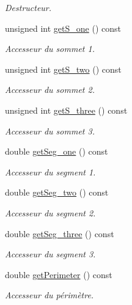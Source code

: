 \begin{DoxyCompactItemize}
\begin{DoxyCompactList}\small\item\em Destructeur. \end{DoxyCompactList}\item 
unsigned int \hyperlink{class_face_ac6ce8497a59d3de67cd861a1d3aeb1ee}{get\-S\-\_\-one} () const 
\begin{DoxyCompactList}\small\item\em Accesseur du sommet 1. \end{DoxyCompactList}\item 
unsigned int \hyperlink{class_face_a2106a9b3661a4dcb41306a7010106221}{get\-S\-\_\-two} () const 
\begin{DoxyCompactList}\small\item\em Accesseur du sommet 2. \end{DoxyCompactList}\item 
unsigned int \hyperlink{class_face_a5bb2a3e263ede7ed39eb044ef7b5e8c7}{get\-S\-\_\-three} () const 
\begin{DoxyCompactList}\small\item\em Accesseur du sommet 3. \end{DoxyCompactList}\item 
double \hyperlink{class_face_a906d16f2f1c9adbe881ae46ee7f3e3e9}{get\-Seg\-\_\-one} () const 
\begin{DoxyCompactList}\small\item\em Accesseur du segment 1. \end{DoxyCompactList}\item 
double \hyperlink{class_face_a50a58b3b43a78239defee57e7202968e}{get\-Seg\-\_\-two} () const 
\begin{DoxyCompactList}\small\item\em Accesseur du segment 2. \end{DoxyCompactList}\item 
double \hyperlink{class_face_a19bb64415987240d90a1ec86d2432f05}{get\-Seg\-\_\-three} () const 
\begin{DoxyCompactList}\small\item\em Accesseur du segment 3. \end{DoxyCompactList}\item 
double \hyperlink{class_face_acd3e36c17c14b6617d92b0b9ecb2b6fc}{get\-Perimeter} () const 
\begin{DoxyCompactList}\small\item\em Accesseur du périmètre. \end{DoxyCompactList}\item 

\end{DoxyCompactItemize}
